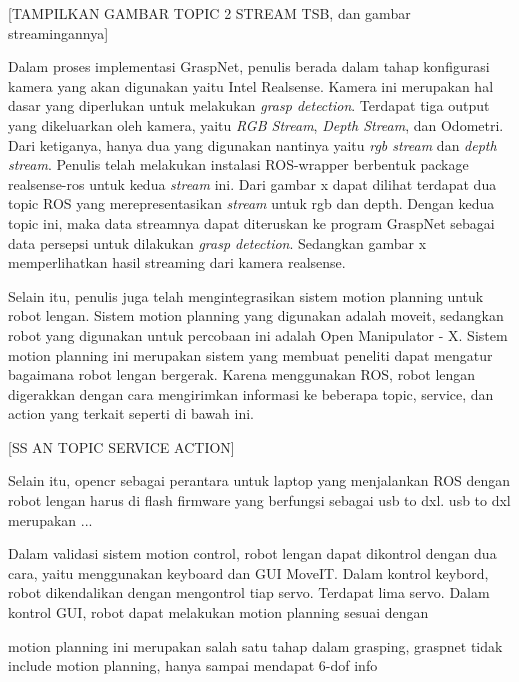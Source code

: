 [TAMPILKAN GAMBAR TOPIC 2 STREAM TSB, dan gambar streamingannya]

Dalam proses implementasi GraspNet, penulis berada dalam tahap konfigurasi kamera yang akan digunakan yaitu Intel Realsense.
Kamera ini merupakan hal dasar yang diperlukan untuk melakukan \emph{grasp detection}. Terdapat tiga output yang dikeluarkan oleh kamera,
yaitu \emph{RGB Stream}, \emph{Depth Stream}, dan Odometri. Dari ketiganya, hanya dua yang digunakan nantinya yaitu \emph{rgb stream}
dan \emph{depth stream}. Penulis telah melakukan instalasi ROS-wrapper berbentuk package realsense-ros untuk kedua \emph{stream} ini.
Dari gambar x dapat dilihat terdapat dua topic ROS yang merepresentasikan \emph{stream} untuk rgb dan depth. Dengan kedua topic ini,
maka data streamnya dapat diteruskan ke program GraspNet sebagai data persepsi untuk dilakukan \emph{grasp detection}. Sedangkan gambar x
memperlihatkan hasil streaming dari kamera realsense.

Selain itu, penulis juga telah mengintegrasikan sistem motion planning untuk robot lengan. Sistem motion planning yang digunakan adalah moveit,
sedangkan robot yang digunakan untuk percobaan ini adalah Open Manipulator - X. Sistem motion planning ini merupakan sistem yang membuat
peneliti dapat mengatur bagaimana robot lengan bergerak. Karena menggunakan ROS, robot lengan digerakkan dengan cara mengirimkan informasi
ke beberapa topic, service, dan action yang terkait seperti di bawah ini.

[SS AN TOPIC SERVICE ACTION]

Selain itu, opencr sebagai perantara untuk laptop yang menjalankan ROS dengan robot lengan harus di flash firmware yang berfungsi sebagai
usb to dxl. usb to dxl merupakan ...

Dalam validasi sistem motion control, robot lengan dapat dikontrol dengan dua cara, yaitu menggunakan keyboard dan GUI MoveIT.
Dalam kontrol keybord, robot dikendalikan dengan mengontrol tiap servo. Terdapat lima servo.
Dalam kontrol GUI, robot dapat melakukan motion planning sesuai dengan 

motion planning ini merupakan salah satu tahap dalam grasping,
graspnet tidak include motion planning, hanya sampai mendapat 6-dof info
